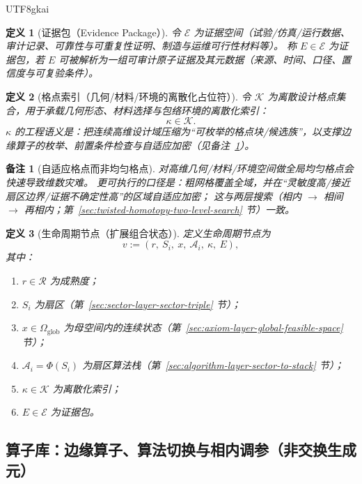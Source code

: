 \documentclass[12pt]{article}
\newtheorem{definition}{定义}[section]
\newtheorem{remark}{备注}[section]
\begin{document}
\begin{CJK*}{UTF8}{gkai}
\begin{definition}[证据包（Evidence Package）]
令 $\mathcal{E}$ 为证据空间（试验/仿真/运行数据、审计记录、可靠性与可重复性证明、制造与运维可行性材料等）。
称 $E\in\mathcal{E}$ 为证据包，若 $E$ 可被解析为一组可审计原子证据及其元数据（来源、时间、口径、置信度与可复验条件）。
\end{definition}

\begin{definition}[格点索引（几何/材料/环境的离散化占位符）]
令 $\mathcal{K}$ 为离散设计格点集合，用于承载几何形态、材料选择与包络环境的离散化索引：
\[
  \kappa\in\mathcal{K}.
\]
$\kappa$ 的工程语义是：把连续高维设计域压缩为“可枚举的格点块/候选族”，以支撑边缘算子的枚举、前置条件检查与自适应加密（见备注~\ref{rem:adaptive-gridding}）。
\end{definition}

\begin{remark}[自适应格点而非均匀格点]
\label{rem:adaptive-gridding}
对高维几何/材料/环境空间做全局均匀格点会快速导致维数灾难。
更可执行的口径是：粗网格覆盖全域，并在“灵敏度高/接近扇区边界/证据不确定性高”的区域自适应加密；
这与两层搜索（相内 $\to$ 相间 $\to$ 再相内；第~\ref{sec:twisted-homotopy-two-level-search} 节）一致。
\end{remark}

\begin{definition}[生命周期节点（扩展组合状态）]
定义生命周期节点为
\[
  v := (r,\ S_i,\ x,\ \mathcal{A}_i,\ \kappa,\ E),
\]
其中：
\begin{enumerate}
  \item $r\in\mathcal{R}$ 为成熟度；
  \item $S_i$ 为扇区（第~\ref{sec:sector-layer-sector-triple} 节）；
  \item $x\in\Omega_{\mathrm{glob}}$ 为母空间内的连续状态（第~\ref{sec:axiom-layer-global-feasible-space} 节）；
  \item $\mathcal{A}_i=\Phi(S_i)$ 为扇区算法栈（第~\ref{sec:algorithm-layer-sector-to-stack} 节）；
  \item $\kappa\in\mathcal{K}$ 为离散化索引；
  \item $E\in\mathcal{E}$ 为证据包。
\end{enumerate}
\end{definition}

\subsection{算子库：边缘算子、算法切换与相内调参（非交换生成元）}
\label{sec:lifecycle-operator-library}


\end{CJK*}
\end{document}
